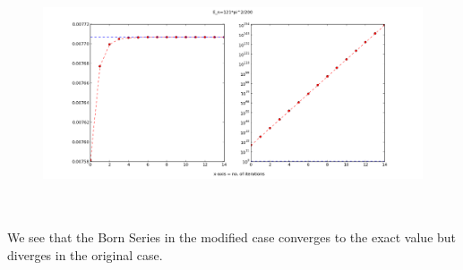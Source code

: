 \documentclass[a4paper,10pt]{report}
\begin{document}
\begin{center}
\begin{figure}[lht]
\includegraphics[width=360pt, height=200pt]{series3c.png}
\end{figure}
\end{center}

We see that the Born Series in the modified case converges to the exact value but diverges in the original case.


\end{document}
